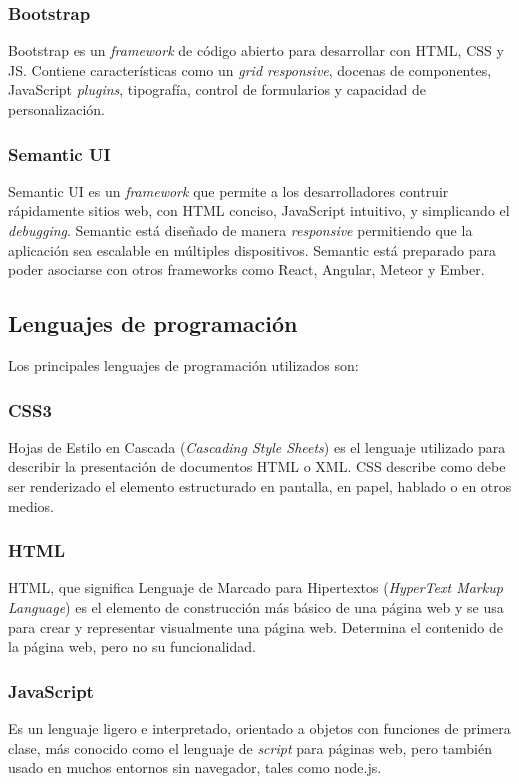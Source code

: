 \subsubsection{Bootstrap}
Bootstrap es un \textit{framework} de código abierto para desarrollar con HTML, CSS y JS. Contiene características como un \textit{grid responsive}, docenas de componentes, JavaScript \textit{plugins}, tipografía, control de formularios y capacidad de personalización\cite{bootstrap}.


\subsubsection{Semantic UI}
Semantic UI es un \textit{framework} que permite a los desarrolladores contruir rápidamente sitios web, con HTML conciso, JavaScript intuitivo, y simplicando el \textit{debugging}. Semantic está diseñado de manera \textit{responsive} permitiendo que la aplicación sea escalable en múltiples dispositivos. Semantic está preparado para poder asociarse con otros frameworks como React, Angular, Meteor y Ember\cite{semantic_github}.


\subsection{Lenguajes de programación}
Los principales lenguajes de programación utilizados son:


\subsubsection{CSS3}
Hojas de Estilo en Cascada (\textit{Cascading Style Sheets}) es el lenguaje utilizado para describir la presentación de documentos HTML o XML. CSS describe como debe ser renderizado el elemento estructurado en pantalla, en papel, hablado o en otros medios\cite{css_mozilla}.


\subsubsection{HTML}
HTML, que significa Lenguaje de Marcado para Hipertextos (\textit{HyperText Markup Language}) es el elemento de construcción más básico de una página web y se usa para crear y representar visualmente una página web. Determina el contenido de la página web, pero no su funcionalidad\cite{html_mozilla}.


\subsubsection{JavaScript}
Es un lenguaje ligero e interpretado, orientado a objetos con funciones de primera clase, más conocido como el lenguaje de \textit{script} para páginas web, pero también usado en muchos entornos sin navegador, tales como node.js.



